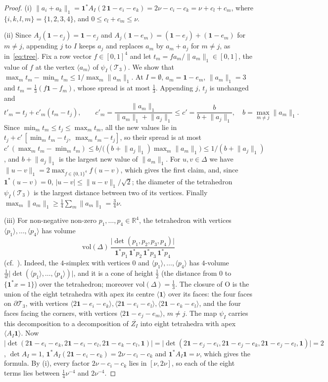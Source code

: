 \documentclass[11pt]{amsart}
\theoremstyle{definition}
\theoremstyle{remark}
\newcommand{\one}{\mathbf 1}
\newcommand{\R}{\mathbb R}
\newcommand{\cT}{\mathcal T}
\newcommand{\Oct}{\mathrm{O}}
\newcommand{\abs}[1]{\lvert #1\rvert}
\newcommand{\norm}[1]{\lVert #1\rVert}
\newcommand{\pr}[1]{\langle #1\rangle}
\begin{document}
\begin{proof}
(i) $\norm{a_i+a_k}_1=\one^*A_I(2\,\one-e_i-e_k)=2\nu-c_i-c_k=\nu+c_l+c_m$, where $\{i,k,l,m\}=\{1,2,3,4\}$, and $0\le c_l+c_m\le\nu$.

(ii) Since $A_j(\one-e_j)=\one-e_j$ and $A_j(\one-e_m)=(\one-e_j)+(\one-e_m)$ for $m\ne j$, appending $j$ to $I$ keeps $a_j$ and replaces $a_m$ by $a_m+a_j$ for $m\ne j$, as in~\eqref{eq:tree}. Fix a row vector $f\in[0,1]^4$ and let $t_m=fa_m/\norm{a_m}_1\in[0,1]$, the value of $f$ at the vertex $\pr{a_m}$ of $\psi_I(\cT_3)$. We show that $\max_mt_m-\min_mt_m\le1/\max_m\norm{a_m}_1$. At $I=\emptyset$, $a_m=\one-e_m$, $\norm{a_m}_1=3$ and $t_m=\frac13(f\one-f_m)$, whose spread is at most $\frac13$. Appending $j$, $t_j$ is unchanged and
\[
  t'_m=t_j+c'_m(t_m-t_j),\qquad c'_m=\frac{\norm{a_m}_1}{\norm{a_m}_1+\norm{a_j}_1}\le c'=\frac{b}{b+\norm{a_j}_1},\quad b=\max_{m\neq j}\norm{a_m}_1 .
\]
Since $\min_mt_m\le t_j\le\max_mt_m$, all the new values lie in $t_j+c'\,[\min_mt_m-t_j,\ \max_mt_m-t_j]$, so their spread is at most $c'\,(\max_mt_m-\min_mt_m)\le b/\bigl((b+\norm{a_j}_1)\max_m\norm{a_m}_1\bigr)\le1/(b+\norm{a_j}_1)$, and $b+\norm{a_j}_1$ is the largest new value of $\norm{a_m}_1$. For $u,v\in\Delta$ we have $\norm{u-v}_1=2\max_{f\in\{0,1\}^4}f(u-v)$, which gives the first claim, and, since $\one^*(u-v)=0$, $\abs{u-v}\le\norm{u-v}_1/\sqrt2$; the diameter of the tetrahedron $\psi_I(\cT_3)$ is the largest distance between two of its vertices. Finally $\max_m\norm{a_m}_1\ge\frac14\sum_m\norm{a_m}_1=\frac34\nu$.

(iii) For non-negative non-zero $p_1,\dots,p_4\in\R^4$, the tetrahedron with vertices $\pr{p_1},\dots,\pr{p_4}$ has volume
\[
  \mathrm{vol}(\Delta)\,\frac{\abs{\det(p_1,p_2,p_3,p_4)}}{\one^*p_1\,\one^*p_2\,\one^*p_3\,\one^*p_4}
\]
(cf.~\cite[Lemma~4.1]{PS24}). Indeed, the $4$-simplex with vertices $0$ and $\pr{p_1},\dots,\pr{p_4}$ has $4$-volume $\frac1{4!}\abs{\det(\pr{p_1},\dots,\pr{p_4})}$, and it is a cone of height $\frac12$ (the distance from $0$ to $\{\one^*x=1\}$) over the tetrahedron; moreover $\mathrm{vol}(\Delta)=\frac13$. The closure of $\Oct$ is the union of the eight tetrahedra with apex its centre $\pr{\one}$ over its faces: the four faces on $\partial \cT_3$, with vertices $\pr{2\one-e_i-e_k},\pr{2\one-e_i-e_l},\pr{2\one-e_k-e_l}$, and the four faces facing the corners, with vertices $\pr{2\one-e_j-e_m}$, $m\neq j$. The map $\psi_I$ carries this decomposition to a decomposition of $\overline{Z_I}$ into eight tetrahedra with apex $\pr{A_I\one}$. Now $\abs{\det(2\one-e_i-e_k,2\one-e_i-e_l,2\one-e_k-e_l,\one)}=\abs{\det(2\one-e_j-e_i,2\one-e_j-e_k,2\one-e_j-e_l,\one)}=2$, $\det A_I=1$, $\one^*A_I(2\one-e_i-e_k)=2\nu-c_i-c_k$ and $\one^*A_I\one=\nu$, which gives the formula. By (i), every factor $2\nu-c_i-c_k$ lies in $[\nu,2\nu]$, so each of the eight terms lies between $\frac14\nu^{-4}$ and $2\nu^{-4}$.


\end{proof}
\end{document}
